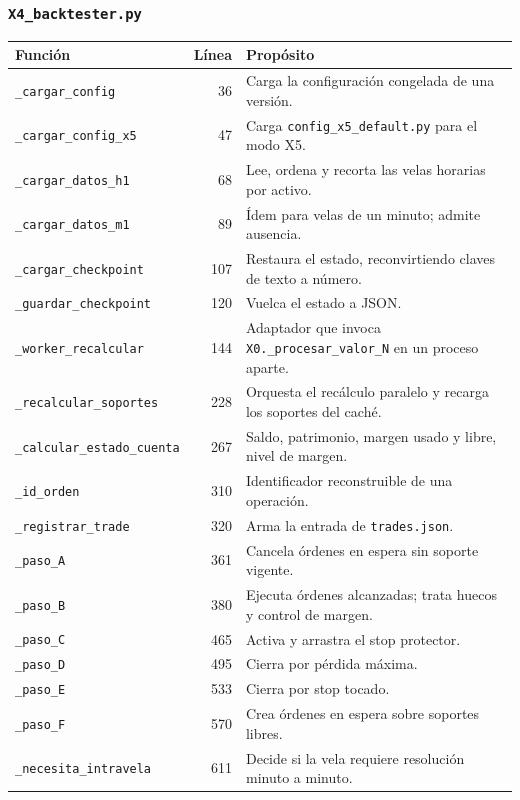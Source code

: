 \documentclass[11pt,a4paper]{article}
\newcommand{\code}[1]{\texttt{\small #1}}
\begin{document}
\subsubsection{\code{X4_backtester.py}}

\begin{longtable}{@{}p{5.2cm} r p{\dimexpr\linewidth-7.3cm\relax}@{}}
\toprule
\textbf{Función} & \textbf{Línea} & \textbf{Propósito} \\
\midrule
\endhead
\code{_cargar_config} & 36 & Carga la configuración congelada de una versión. \\
\code{_cargar_config_x5} & 47 & Carga \code{config_x5_default.py} para el modo X5. \\
\code{_cargar_datos_h1} & 68 & Lee, ordena y recorta las velas horarias por activo. \\
\code{_cargar_datos_m1} & 89 & Ídem para velas de un minuto; admite ausencia. \\
\code{_cargar_checkpoint} & 107 & Restaura el estado, reconvirtiendo claves de texto a número. \\
\code{_guardar_checkpoint} & 120 & Vuelca el estado a JSON. \\
\code{_worker_recalcular} & 144 & Adaptador que invoca \code{X0._procesar_valor_N} en un proceso aparte. \\
\code{_recalcular_soportes} & 228 & Orquesta el recálculo paralelo y recarga los soportes del caché. \\
\code{_calcular_estado_cuenta} & 267 & Saldo, patrimonio, margen usado y libre, nivel de margen. \\
\code{_id_orden} & 310 & Identificador reconstruible de una operación. \\
\code{_registrar_trade} & 320 & Arma la entrada de \code{trades.json}. \\
\code{_paso_A} & 361 & Cancela órdenes en espera sin soporte vigente. \\
\code{_paso_B} & 380 & Ejecuta órdenes alcanzadas; trata huecos y control de margen. \\
\code{_paso_C} & 465 & Activa y arrastra el stop protector. \\
\code{_paso_D} & 495 & Cierra por pérdida máxima. \\
\code{_paso_E} & 533 & Cierra por stop tocado. \\
\code{_paso_F} & 570 & Crea órdenes en espera sobre soportes libres. \\
\code{_necesita_intravela} & 611 & Decide si la vela requiere resolución minuto a minuto. \\

\end{longtable}
\end{document}
